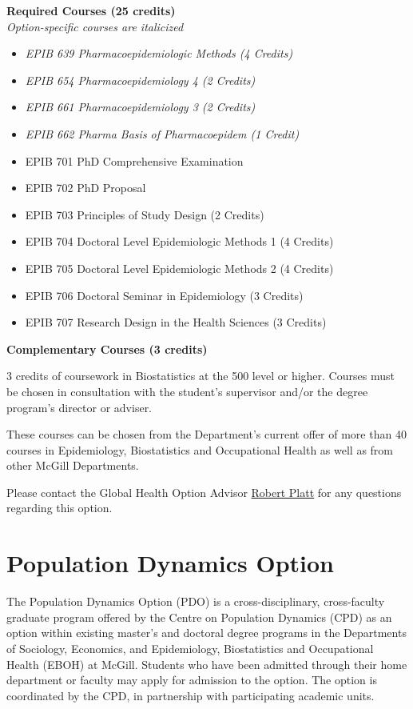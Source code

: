 \documentclass[
  openany]{book}
\providecommand{\tightlist}{%
  \setlength{\itemsep}{0pt}\setlength{\parskip}{0pt}}
\begin{document}
\textbf{Required Courses (25 credits)}\\
\emph{Option-specific courses are italicized}

\begin{itemize}
\tightlist
\item
  \emph{EPIB 639 Pharmacoepidemiologic Methods (4 Credits)}
\item
  \emph{EPIB 654 Pharmacoepidemiology 4 (2 Credits)}
\item
  \emph{EPIB 661 Pharmacoepidemiology 3 (2 Credits)}
\item
  \emph{EPIB 662 Pharma Basis of Pharmacoepidem (1 Credit)}
\item
  EPIB 701 PhD Comprehensive Examination
\item
  EPIB 702 PhD Proposal
\item
  EPIB 703 Principles of Study Design (2 Credits)
\item
  EPIB 704 Doctoral Level Epidemiologic Methods 1 (4 Credits)
\item
  EPIB 705 Doctoral Level Epidemiologic Methods 2 (4 Credits)
\item
  EPIB 706 Doctoral Seminar in Epidemiology (3 Credits)
\item
  EPIB 707 Research Design in the Health Sciences (3 Credits)
\end{itemize}

\textbf{Complementary Courses (3 credits)}

3 credits of coursework in Biostatistics at the 500 level or higher. Courses must be chosen in consultation with the student's supervisor and/or the degree program's director or adviser.

These courses can be chosen from the Department's current offer of more than 40 courses in Epidemiology, Biostatistics and Occupational Health as well as from other McGill Departments.

Please contact the Global Health Option Advisor \href{mailto:robert.platt@mcgill.ca}{Robert Platt} for any questions regarding this option.

\hypertarget{population-dynamics-option}{%
\section{Population Dynamics Option}\label{population-dynamics-option}}

The Population Dynamics Option (PDO) is a cross-disciplinary, cross-faculty graduate program offered by the Centre on Population Dynamics (CPD) as an option within existing master's and doctoral degree programs in the Departments of Sociology, Economics, and Epidemiology, Biostatistics and Occupational Health (EBOH) at McGill. Students who have been admitted through their home department or faculty may apply for admission to the option. The option is coordinated by the CPD, in partnership with participating academic units.
\end{document}
